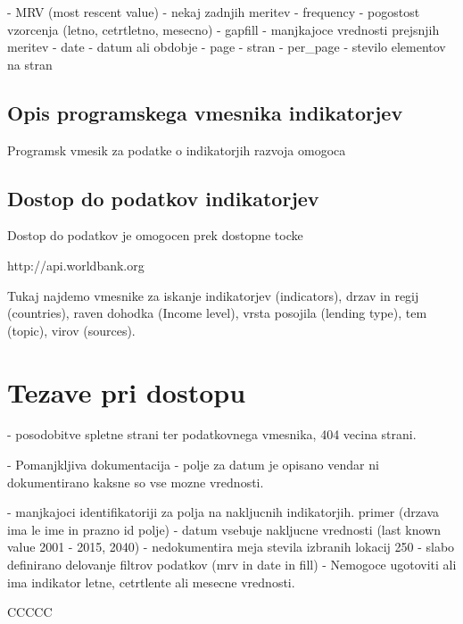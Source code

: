 - MRV (most rescent value) - nekaj zadnjih meritev
- frequency - pogostost vzorcenja (letno, cetrtletno, mesecno)
- gapfill - manjkajoce vrednosti prejsnjih meritev
- date - datum ali obdobje
- page - stran
- per\_page - stevilo elementov na stran








\subsection{Opis programskega vmesnika indikatorjev}


Programsk vmesik za podatke o indikatorjih razvoja omogoca 


\subsection{Dostop do podatkov indikatorjev}

Dostop do podatkov je omogocen prek dostopne tocke

http://api.worldbank.org

Tukaj najdemo vmesnike za iskanje indikatorjev (indicators), drzav in regij
(countries), raven dohodka (Income level), vrsta posojila (lending type), tem
(topic), virov (sources).





\section{Tezave pri dostopu}

- posodobitve spletne strani ter podatkovnega vmesnika, 404 vecina strani.

- Pomanjkljiva dokumentacija
    - polje za datum je opisano vendar ni dokumentirano kaksne so vse mozne
      vrednosti. 

- manjkajoci identifikatoriji za polja na nakljucnih indikatorjih.
  primer (drzava ima le ime in prazno id polje)
- datum vsebuje nakljucne vrednosti (last known value 2001 - 2015, 2040)
- nedokumentira meja stevila izbranih lokacij 250
- slabo definirano delovanje filtrov podatkov (mrv in date in fill)
- Nemogoce ugotoviti ali ima indikator letne, cetrtlente ali mesecne vrednosti.



CCCCC
